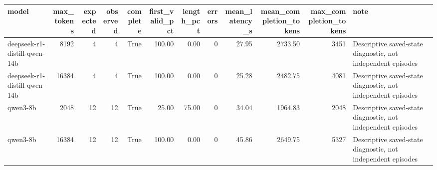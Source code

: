 \begin{tabular}{lrrrrrrrrrrl}
\toprule
model & max\_tokens & expected & observed & complete & first\_valid\_pct & length\_pct & errors & mean\_latency\_s & mean\_completion\_tokens & max\_completion\_tokens & note \\
\midrule
deepseek-r1-distill-qwen-14b & 8192 & 4 & 4 & True & 100.00 & 0.00 & 0 & 27.95 & 2733.50 & 3451 & Descriptive saved-state diagnostic, not independent episodes \\
deepseek-r1-distill-qwen-14b & 16384 & 4 & 4 & True & 100.00 & 0.00 & 0 & 25.28 & 2482.75 & 4081 & Descriptive saved-state diagnostic, not independent episodes \\
qwen3-8b & 2048 & 12 & 12 & True & 25.00 & 75.00 & 0 & 34.04 & 1964.83 & 2048 & Descriptive saved-state diagnostic, not independent episodes \\
qwen3-8b & 16384 & 12 & 12 & True & 100.00 & 0.00 & 0 & 45.86 & 2649.75 & 5327 & Descriptive saved-state diagnostic, not independent episodes \\
\bottomrule
\end{tabular}
